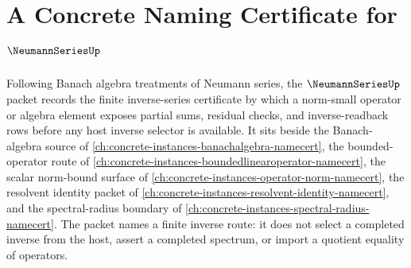 \chapter{A Concrete Naming Certificate for $\NeumannSeriesUp$}
\label{ch:concrete-instances-neumann-series-namecert}

Following Banach algebra treatments of Neumann series, the $\NeumannSeriesUp$ packet records the finite inverse-series certificate by which a norm-small operator or algebra element exposes partial sums, residual checks, and inverse-readback rows before any host inverse selector is available. It sits beside the Banach-algebra source of \autoref{ch:concrete-instances-banachalgebra-namecert}, the bounded-operator route of \autoref{ch:concrete-instances-boundedlinearoperator-namecert}, the scalar norm-bound surface of \autoref{ch:concrete-instances-operator-norm-namecert}, the resolvent identity packet of \autoref{ch:concrete-instances-resolvent-identity-namecert}, and the spectral-radius boundary of \autoref{ch:concrete-instances-spectral-radius-namecert}. The packet names a finite inverse route: it does not select a completed inverse from the host, assert a completed spectrum, or import a quotient equality of operators.

